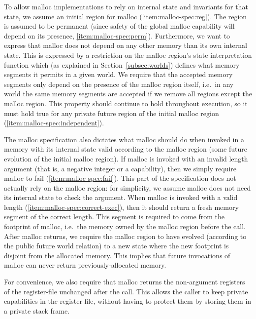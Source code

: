 \documentclass[format=acmsmall, review=true, screen=true]{acmart}
\renewcommand{\sectionname}{Section}
\newenvironment{toplas}%
    {\color{OliveGreen}}{}
\begin{document}
\begin{toplas}
To allow malloc implementations to rely on internal state and invariants for
that state, we assume an initial region for malloc (\ref{item:malloc-spec:reg}). The region is assumed to be
permanent (since safety of the global malloc capability will depend on its
presence, \ref{item:malloc-spec:perm}).
Furthermore, we want to express that malloc does not depend on any other memory
than its own internal state. This is expressed by a restriction on the malloc
region's state interpretation function which (as explained in
\sectionname~\ref{subsec:worlds}) defines what memory segments it permits in a
given world. We require that the accepted memory segments only depend on the
presence of the malloc region itself, i.e.\ in any world the same memory
segments are accepted if we remove all regions except the malloc region. This
property should continue to hold throughout execution, so it must hold true for
any private future region of the initial malloc region (\ref{item:malloc-spec:independent}).

The malloc specification also dictates what malloc should do when invoked in a
memory with its internal state valid according to the malloc region (some future
evolution of the initial malloc region). If malloc is invoked with an invalid
length argument (that is, a negative integer or a capability), then we simply
require malloc to fail (\ref{item:malloc-spec:fail}). This part of the
specification does not actually rely on the malloc region: for simplicity, we
assume malloc does not need its internal state to check the argument. When
malloc is invoked with a valid length (\ref{item:malloc-spec:correct-exec}),
then it should return a fresh memory segment of the correct length. This segment
is required to come from the footprint of malloc, i.e.\ the memory owned by the
malloc region before the call. After malloc returns, we require the malloc
region to have evolved (according to the public future world relation) to a new
state where the new footprint is disjoint from the allocated memory. This
implies that future invocations of malloc can never return previously-allocated
memory.

For convenience, we also require that malloc returns the non-argument registers
of the register-file unchanged after the call. This allows the caller to keep
private capabilities in the register file, without having to protect them by
storing them in a private stack frame.


\end{toplas}
\end{document}
